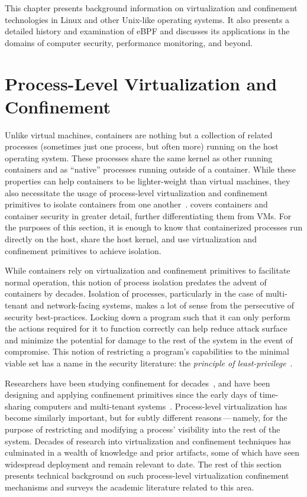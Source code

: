 This chapter presents background information on virtualization and confinement
technologies in Linux and other Unix-like operating systems. It also presents a detailed
history and examination of eBPF and discusses its applications in the domains of computer
security, performance monitoring, and beyond.

\section{Process-Level Virtualization and Confinement}%
\label{s:virtualization-and-confinement}

Unlike virtual machines, containers are nothing but a collection of related processes
(sometimes just one process, but often more) running on the host operating system. These
processes share the same kernel as other running containers and as \enquote{native}
processes running outside of a container. While these properties can help containers to be
lighter-weight than virtual machines, they also necessitate the usage of process-level
virtualization and confinement primitives to isolate containers from one
another~\cite{sultan2019_container_security}.   covers
containers and container security in greater detail, further differentiating them from
VMs. For the purposes of this section, it is enough to know that containerized processes
run directly on the host, share the host kernel, and use virtualization and confinement
primitives to achieve isolation.

While containers rely on virtualization and confinement primitives to facilitate normal
operation, this notion of process isolation predates the advent of containers by decades.
Isolation of processes, particularly in the case of multi-tenant and network-facing
systems, makes a lot of sense from the persecutive of security best-practices. Locking
down a program such that it can only perform the actions required for it to function
correctly can help reduce attack surface and minimize the potential for damage to the rest
of the system in the event of compromise. This notion of restricting a program's
capabilities to the minimal viable set has a name in the security literature: the
\textit{principle of least-privilege}~\cite{schneider03_least_privilege,
van_oorschot2020_tools_jewels}.

Researchers have been studying confinement for decades~\cite{lampson1973_confinement}, and
have been designing and applying confinement primitives since the early days of
time-sharing computers and multi-tenant systems~\cite{shu2016_security_isolation_study}.
Process-level virtualization has become similarly important, but for subtly different
reasons\,---\,namely, for the purpose of restricting and modifying a process' visibility
into the rest of the system.  Decades of research into virtualization and confinement
techniques has culminated in a wealth of knowledge and prior artifacts, some of which have
seen widespread deployment and remain relevant to date. The rest of this section presents
technical background on such process-level virtualization confinement mechanisms and
surveys the academic literature related to this area.

